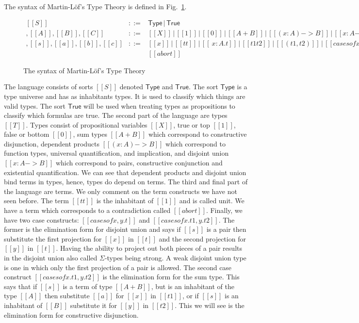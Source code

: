 The syntax of Martin-L\"of's Type Theory is defined in
Fig.~\ref{fig:lof_syntax}.
\begin{figure}
  \begin{center}
    \begin{math}
      \begin{array}{lll}
        [[S]] & ::= & \mathsf{Type}\,|\,\mathsf{True}\\
        [[T]], [[A]], [[B]], [[C]]        & ::= & [[X]]\,|\,[[1]]\,|\,[[0]]\,|\,[[A + B]]\,|\,[[( x : A ) -> B]]\,|\,[[{ x : A } -> B]]\\
        [[t]], [[s]], [[a]], [[b]], [[c]] & ::= &
        [[x]]\,|\,[[tt]]\,|\,[[\ x : A . t]]\,|\,[[t1 t2]]\,|\,[[( t1
        , t2 )]]\,|\,[[case s of x , y . t]]\,|\,[[case s of x . t1 ,
        y . t2]]\,|\,\\& & [[abort]]
      \end{array}
    \end{math}
  \end{center}
  \caption{The syntax of Martin-L\"of's Type Theory}
  \label{fig:lof_syntax}
\end{figure}
The language consists of sorts $[[S]]$ denoted $\mathsf{Type}$ and
$\mathsf{True}$. The sort $\mathsf{Type}$ is a type universe and has
as inhabitants types.  It is used to classify which things are valid
types.  The sort $\mathsf{True}$ will be used when treating
types as propositions to classify which formulas are true. The second
part of the language are types $[[T]]$.  Types consist of
propositional variables $[[X]]$, true or top $[[1]]$, false or bottom
$[[0]]$, sum types $[[A + B]]$ which correspond to constructive
disjunction, dependent products $[[(x : A) -> B]]$ which correspond to
function types, universal quantification, and implication, and
disjoint union $[[{ x : A} -> B]]$ which correspond to pairs,
constructive conjunction and existential quantification.  We can see
that dependent products and disjoint union bind terms in types, hence,
types do depend on terms.  The third and final part of the language
are terms.  We only comment on the term constructs we have not seen
before.  The term $[[tt]]$ is the inhabitant of $[[1]]$ and is called
unit.  We have a term which corresponds to a contradiction called
$[[abort]]$. Finally, we have two case constructs: $[[case s of
    x,y.t]]$ and $[[case s of x.t1,y.t2]]$.  The former is the
elimination form for disjoint union and says if $[[s]]$ is a pair then
substitute the first projection for $[[x]]$ in $[[t]]$ and the second
projection for $[[y]]$ in $[[t]]$.  Having the ability to project out
both pieces of a pair results in the disjoint union also called
$\Sigma$-types being strong.  A weak disjoint union type is one in
which only the first projection of a pair is allowed.  The second case
construct $[[case s of x.t1,y.t2]]$ is the elimination form for the
sum type.  This says that if $[[s]]$ is a term of type $[[A+B]]$, but
is an inhabitant of the type $[[A]]$ then substitute $[[a]]$ for
$[[x]]$ in $[[t1]]$, or if $[[s]]$ is an inhabitant of $[[B]]$
substitute it for $[[y]]$ in $[[t2]]$.  This we will see is the
elimination form for constructive disjunction.

